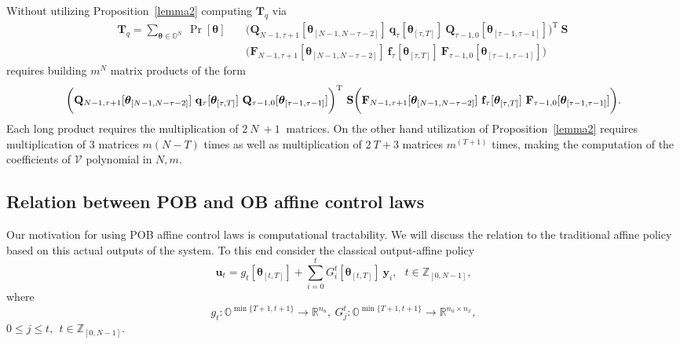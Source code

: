\documentclass[letterpaper,11pt]{article}
\newcommand{\T}{\mathrm{T}}
\begin{document}
\vspace{0.1in}

Without utilizing Proposition~\ref{lemma2} computing $\mathbf{T}_q$ via
\begin{eqnarray*}
	\mathbf{T}_q  =  \sum_{\bm{\theta} \in \mathbb{O}^N}~ 	\Pr[\bm{\theta} ]~
	&&\bigg( \mathbf{Q}_{N-1, \tau+1}[\bm{\theta}_{[N-1,N-\tau-2]}] ~ 
	\mathbf{q}_{\tau}[\bm{\theta}_{[\tau,T]}] ~ 
	\mathbf{Q}_{\tau-1, 0}[\bm{\theta}_{[\tau-1,\tau-1]}]
	\bigg)^\T ~ \mathbf{S} ~ \\
	&&  \bigg( \mathbf{F}_{N-1, \tau+1}[\bm{\theta}_{[N-1,N-\tau-2]}] ~ 
	\mathbf{f}_{\tau}[\bm{\theta}_{[\tau,T]}] ~ 
	\mathbf{F}_{\tau-1, 0}[\bm{\theta}_{[\tau-1,\tau-1]}]
	\bigg) 
\end{eqnarray*}
requires building $m^N$ matrix products of the form 
$$ \bigg( \mathbf{Q}_{N-1, \tau+1}[\bm{\theta}_{[N-1,N-\tau-2]}] ~ 
\mathbf{q}_{\tau}[\bm{\theta}_{[\tau,T]}] ~ 
\mathbf{Q}_{\tau-1, 0}[\bm{\theta}_{[\tau-1,\tau-1]}]
\bigg)^\T ~ \mathbf{S} ~ \\
\bigg( \mathbf{F}_{N-1, \tau+1}[\bm{\theta}_{[N-1,N-\tau-2]}] ~ 
\mathbf{f}_{\tau}[\bm{\theta}_{[\tau,T]}] ~ 
\mathbf{F}_{\tau-1, 0}[\bm{\theta}_{[\tau-1,\tau-1]}]
\bigg). $$
Each long product requires the multiplication of $2~N~+1~$ matrices. 
On the other hand utilization of Proposition~\ref{lemma2} requires 
multiplication of 3 matrices $m (N-T)$ times as well as multiplication of $2  ~T +  3$ matrices $m^{(T+1)}$ times, making
the computation of the coefficients of $ \mathcal{V}  $ polynomial in $N,m$. 

















\subsection{Relation between POB and OB affine control laws}

Our motivation for using POB affine control laws is computational tractability. 
We will discuss the relation to the traditional affine policy based on this actual outputs of the system. 
To this end consider the classical output-affine policy 
\begin{equation}
\label{control_out}
\mathbf{u}_t = g_{t}[\bm{\theta}_{[t,T]}] + \sum_{i=0}^t
G_i^t[\bm{\theta}_{[t,T]}]~ \mathbf{y}_i,~~
~t \in  \mathbb{Z}_{[0,N-1]},
\end{equation}
where
\begin{equation}
\label{parameters_out_control}
g_{t} :  \mathbb{O}^{\min{\{T+1,t+1\}}}  \rightarrow \mathbb{R}^{n_u},~ G_j^t :    \mathbb{O}^{\min{\{T+1,t+1\}}} \rightarrow \mathbb{R}^{n_u \times n_x},
\end{equation}
$0 \leq j \leq t, ~~ t \in \mathbb{Z}_{[0,N-1]}$. 
\end{document}
